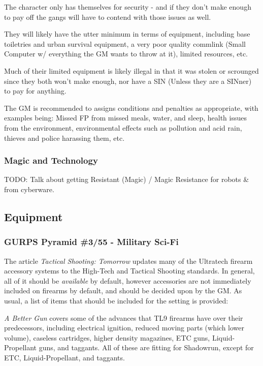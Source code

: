 \begin{multicols*}{2}
	The character only has themselves for security - and if they don't make enough to pay off the gangs will have to contend with those issues as well. 
	
	They will likely have the utter minimum in terms of equipment, including base toiletries and urban survival equipment, a very poor quality commlink (Small Computer w/ everything the GM wants to throw at it), limited resources, etc. 
	
	Much of their limited equipment is likely illegal in that it was stolen or scrounged since they both won't make enough, nor have a SIN (Unless they are a SINner) to pay for anything.
	
	The GM is recommended to assigns conditions and penalties as appropriate, with examples being: Missed FP from missed meals, water, and sleep, health issues from the environment, environmental effects such as pollution and acid rain, thieves and police harassing them, etc. \\
	
	\subsubsection{Magic and Technology}
	
	TODO: Talk about getting Resistant (Magic) / Magic Resistance for robots \& from cyberware.
	
	\subsection{Equipment}\label{setting_equipment}
	
	\subsubsection{GURPS Pyramid \#3/55 - Military Sci-Fi}\label{3/55}
	
	The article \textit{Tactical Shooting: Tomorrow} updates many of the Ultratech firearm accessory systems to the High-Tech and Tactical Shooting standards. In general, all of it should be \textit{available} by default, however accessories are not immediately included on firearms by default, and should be decided upon by the GM. As usual, a list of items that should be included for the setting is provided:
	
	\textit{A Better Gun} covers some of the advances that TL9 firearms have over their predecessors, including electrical ignition, reduced moving parts (which lower volume), caseless cartridges, higher density magazines, ETC guns, Liquid-Propellant guns, and taggants. All of these are fitting for Shadowrun, except for ETC, Liquid-Propellant, and taggants.
	

\end{multicols*}
